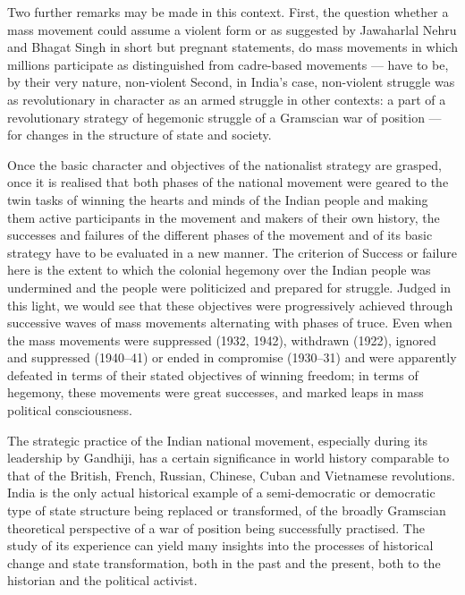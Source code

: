 \begin{multicols}{2}
Two further remarks may be made in this context. First, the question whether a mass movement could assume a violent form or as suggested by Jawaharlal Nehru and Bhagat Singh in short but pregnant statements, do mass movements in which millions participate as distinguished from cadre-based movements --- have to be, by their very nature, non-violent Second, in India's case, non-violent struggle was as revolutionary in character as an armed struggle in other contexts: a part of a revolutionary strategy of hegemonic struggle of a Gramscian war of position --- for changes in the structure of state and society.

Once the basic character and objectives of the nationalist strategy are grasped, once it is realised that both phases of the national movement were geared to the twin tasks of winning the hearts and minds of the Indian people and making them active participants in the movement and makers of their own history, the successes and failures of the different phases of the movement and of its basic strategy have to be evaluated in a new manner. The criterion of Success or failure here is the extent to which the colonial hegemony over the Indian people was undermined and the people were politicized and prepared for struggle. Judged in this light, we would see that these objectives were progressively achieved through successive waves of mass movements alternating with phases of truce. Even when the mass movements were suppressed (1932, 1942), withdrawn (1922), ignored and suppressed (1940--41) or ended in compromise (1930--31) and were apparently defeated in terms of their stated objectives of winning freedom; in terms of hegemony, these movements were great successes, and marked leaps in mass political consciousness.

The strategic practice of the Indian national movement, especially during its leadership by Gandhiji, has a certain significance in world history comparable to that of the British, French, Russian, Chinese, Cuban and Vietnamese revolutions. India is the only actual historical example of a semi-democratic or democratic type of state structure being replaced or transformed, of the broadly Gramscian theoretical perspective of a war of position being successfully practised. The study of its experience can yield many insights into the processes of historical change and state transformation, both in the past and the present, both to the historian and the political activist.


\end{multicols}
